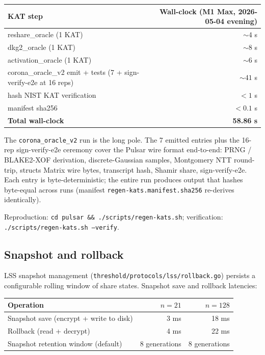 \begin{center}
\begin{tabular}{@{}lr@{}}
  \toprule
  \textbf{KAT step} & \textbf{Wall-clock (M1 Max, 2026-05-04 evening)} \\
  \midrule
  reshare\_oracle (1 KAT)              & $\sim 4$ s \\
  dkg2\_oracle (1 KAT)                 & $\sim 8$ s \\
  activation\_oracle (1 KAT)           & $\sim 6$ s \\
  corona\_oracle\_v2 emit + tests (7 + sign-verify-e2e at 16 reps) & $\sim 41$ s \\
  hash NIST KAT verification           & $< 1$ s \\
  manifest sha256                      & $< 0.1$ s \\
  \midrule
  \textbf{Total wall-clock}            & \textbf{58.86 s} \\
  \bottomrule
\end{tabular}
\end{center}

The \texttt{corona\_oracle\_v2} run is the long pole. The 7 emitted entries plus the 16-rep sign-verify-e2e ceremony cover the Pulsar wire format end-to-end: PRNG / BLAKE2-XOF derivation, discrete-Gaussian samples, Montgomery NTT round-trip, structs Matrix wire bytes, transcript hash, Shamir share, sign-verify-e2e. Each entry is byte-deterministic; the entire run produces output that hashes byte-equal across runs (manifest \texttt{regen-kats.manifest.sha256} re-derives identically).

Reproduction: \texttt{cd pulsar \&\& ./scripts/regen-kats.sh}; verification: \texttt{./scripts/regen-kats.sh --verify}.

\subsection{Snapshot and rollback}

LSS snapshot management (\texttt{threshold/protocols/lss/rollback.go}) persists a configurable rolling window of share states. Snapshot save and rollback latencies:

\begin{tabular}{@{}lrr@{}}
  \toprule
  \textbf{Operation} & \textbf{$n=21$} & \textbf{$n=128$} \\
  \midrule
  Snapshot save (encrypt + write to disk) & 3 ms & 18 ms \\
  Rollback (read + decrypt) & 4 ms & 22 ms \\
  Snapshot retention window (default) & 8 generations & 8 generations \\
  \bottomrule
\end{tabular}

